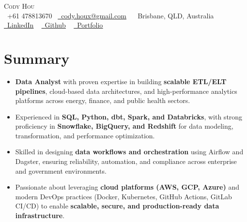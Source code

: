\documentclass[letterpaper,11pt]{article}
\begin{document}
\begin{center}
  {\Huge \scshape Cody Hou} \\ \vspace{5pt}
  \small \raisebox{-0.1\height}\faPhone\ +61 478813670~ 
  \href{mailto:cody.houx@gmail.com}{\raisebox{-0.2\height}\faEnvelope\  \underline{cody.houx@gmail.com}} ~
  \faMapMarker\ Brisbane, QLD, Australia ~
  \href{https://www.linkedin.com/in/ce-hou}{\raisebox{-0.2\height}\faLinkedin\ \underline{LinkedIn}}  ~
  \href{https://github.com/DataCody}{\raisebox{-0.2\height}\faGithub\ \underline{Github}} ~
  \href{https://datacody.github.io/}{\raisebox{-0.2\height}\faGlobe\ \underline{Portfolio}}
  \vspace{-8pt}
\end{center}


\section{Summary}
\begin{itemize}[leftmargin=0.15in, label={•}]
\setlength{\itemsep}{-3pt}
    \item \textbf{Data Analyst} with proven expertise in building \textbf{scalable ETL/ELT pipelines}, cloud-based data architectures, and high-performance analytics platforms across energy, finance, and public health sectors.
    \item Experienced in \textbf{SQL, Python, dbt, Spark, and Databricks}, with strong proficiency in \textbf{Snowflake, BigQuery, and Redshift} for data modeling, transformation, and performance optimization.
    \item Skilled in designing \textbf{data workflows and orchestration} using Airflow and Dagster, ensuring reliability, automation, and compliance across enterprise and government environments.
    \item Passionate about leveraging \textbf{cloud platforms (AWS, GCP, Azure)} and modern DevOps practices (Docker, Kubernetes, GitHub Actions, GitLab CI/CD) to enable \textbf{scalable, secure, and production-ready data infrastructure}.
\end{itemize}
\vspace{-15pt}

\end{document}
